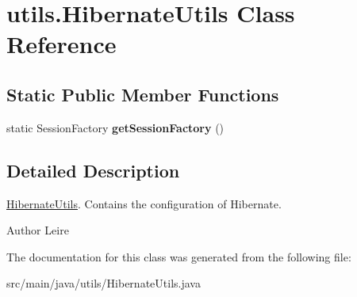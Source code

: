 \hypertarget{classutils_1_1_hibernate_utils}{}\section{utils.\+Hibernate\+Utils Class Reference}
\label{classutils_1_1_hibernate_utils}
\subsection*{Static Public Member Functions}
\begin{DoxyCompactItemize}
\item 
\mbox{\label{classutils_1_1_hibernate_utils_a48f212775a4d87ceb1116c11f05d4053}} 
static Session\+Factory {\bfseries get\+Session\+Factory} ()
\end{DoxyCompactItemize}


\subsection{Detailed Description}
\mbox{\hyperlink{classutils_1_1_hibernate_utils}{Hibernate\+Utils}}. Contains the configuration of Hibernate.

\begin{DoxyAuthor}{Author}
Leire 
\end{DoxyAuthor}


The documentation for this class was generated from the following file\+:\begin{DoxyCompactItemize}
\item 
src/main/java/utils/Hibernate\+Utils.\+java\end{DoxyCompactItemize}
